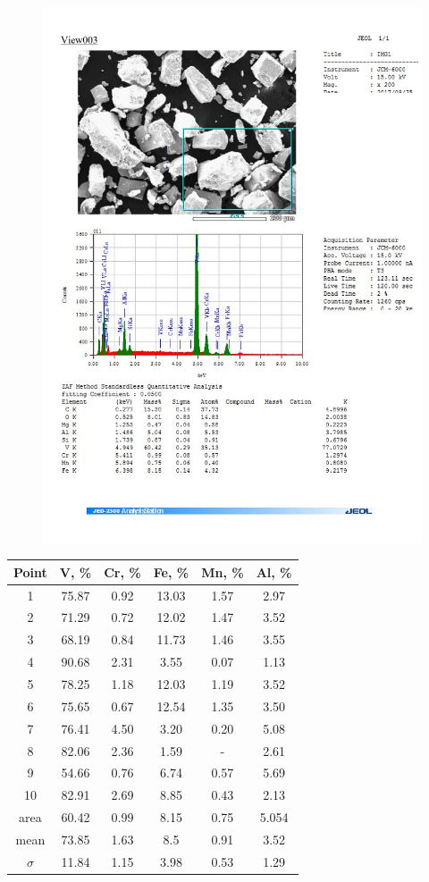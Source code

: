 \documentclass[12pt]{article}
\begin{document}
\begin{figure}[H]
	\includegraphics[width = \linewidth]{./pictures/area_spec.jpg}
\end{figure}

\begin{table}
	\centering
	\begin{tabular}{|c|c|c|c|c|c|}
		\hline
		Point & V, \% & Cr, \% & Fe, \% & Mn, \% & Al, \% \\
		\hline
		1 & 75.87 & 0.92 & 13.03 & 1.57 & 2.97 \\
		2 & 71.29 & 0.72 & 12.02 & 1.47 & 3.52 \\
		3 & 68.19 & 0.84 & 11.73 & 1.46 & 3.55 \\
		4 & 90.68 & 2.31 & 3.55 & 0.07 & 1.13 \\
		5 & 78.25 & 1.18 & 12.03 & 1.19 & 3.52 \\
		6 & 75.65 & 0.67 & 12.54 & 1.35 & 3.50 \\
		7 & 76.41 & 4.50 & 3.20 & 0.20 & 5.08 \\
		8 & 82.06 & 2.36 & 1.59 & - & 2.61 \\
		9 & 54.66 & 0.76 & 6.74 & 0.57 & 5.69 \\
		10 & 82.91 & 2.69 & 8.85 & 0.43 & 2.13 \\
		area & 60.42 & 0.99 & 8.15 & 0.75 & 5.054 \\ \hline
		mean & 73.85 & 1.63 & 8.5 & 0.91 & 3.52 \\ \hline
		$\sigma$ & 11.84 & 1.15 & 3.98 & 0.53 & 1.29 \\ \hline
	\end{tabular}
\end{table}
\end{document}
